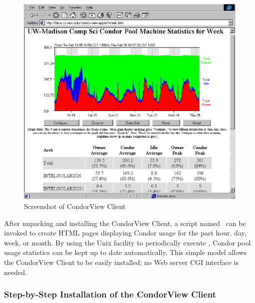 \begin{figure}[hbt]
\centering
\includegraphics{admin-man/view-screenshot.ps}
\caption{\label{fig:view-screenshot}Screenshot of CondorView Client}
\end{figure}

After unpacking and installing the CondorView Client, a script named
\MakeStats\ can be invoked to create HTML pages displaying Condor usage
for the past hour, day, week, or month.  
By using the Unix  facility to periodically execute
\MakeStats, Condor pool usage statistics can be kept up to date
automatically.  
This simple model allows the CondorView Client to be easily installed;
no Web server CGI interface is needed.

\subsubsection{\label{sec:condorview-client-step-by-step}
Step-by-Step Installation of the CondorView Client}

